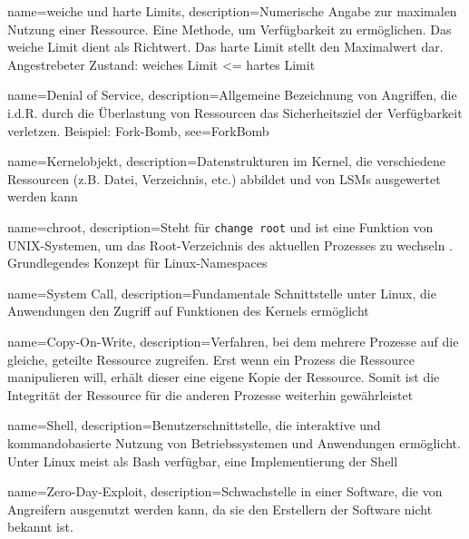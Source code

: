 {%
  name={weiche und harte Limits},
  description={Numerische Angabe zur maximalen Nutzung einer Ressource. Eine Methode, um Verfügbarkeit zu ermöglichen. Das weiche Limit dient als Richtwert. Das harte Limit stellt den Maximalwert dar. Angestrebeter Zustand: weiches Limit \textless= hartes Limit}
}

{%
  name={Denial of Service},
  description={Allgemeine Bezeichnung von Angriffen, die i.d.R. durch die Überlastung von Ressourcen das Sicherheitsziel der Verfügbarkeit verletzen. Beispiel: Fork-Bomb},
  see={ForkBomb}
}

{%
  name={Kernelobjekt},
  description={Datenstrukturen im Kernel, die verschiedene Ressourcen (z.B. Datei, Verzeichnis, etc.) abbildet und von LSMs ausgewertet werden kann \cite{kernelObjects}}
}

{%
  name={chroot},
  description={Steht für \texttt{change root} und ist eine Funktion von UNIX-Systemen, um das Root-Verzeichnis des aktuellen Prozesses zu wechseln \cite{chroot}. Grundlegendes Konzept für Linux-Namespaces}
}

{%
  name={System Call},
  description={Fundamentale Schnittstelle unter Linux, die Anwendungen den Zugriff auf Funktionen des Kernels ermöglicht \cite{systemcall}}
}

{%
  name={Copy-On-Write},
  description={Verfahren, bei dem mehrere Prozesse auf die gleiche, geteilte Ressource zugreifen. Erst wenn ein Prozess die Ressource manipulieren will, erhält dieser eine eigene Kopie der Ressource. Somit ist die Integrität der Ressource für die anderen Prozesse weiterhin gewährleistet \cite{dockerImagesAndContainers}}
}

{%
  name={Shell},
  description={Benutzerschnittstelle, die interaktive und kommandobasierte Nutzung von Betriebssystemen und Anwendungen ermöglicht. Unter Linux meist als Bash verfügbar, eine Implementierung der Shell}
}

{%
  name={Zero-Day-Exploit},
  description={Schwachstelle in einer Software, die von Angreifern ausgenutzt werden kann, da sie den Erstellern der Software nicht bekannt ist.}
}

